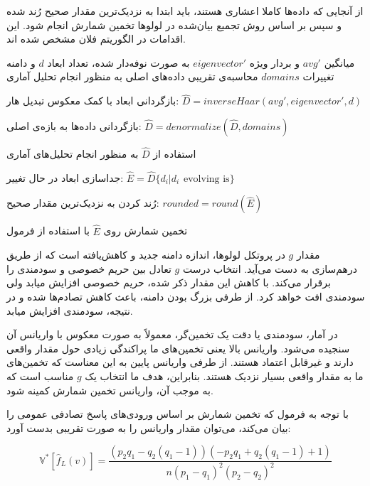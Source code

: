 از آنجایی که داده‌ها کاملا اعشاری هستند، باید ابتدا به نزدیک‌ترین مقدار صحیح رُند شده و سپس بر اساس روش تجمیع بیان‌شده در لولوها تخمین شمارش انجام شود. این اقدامات در الگوریتم فلان مشخص شده اند.


 میانگین $avg'$ و بردار ویژه $eigenvector'$ به صورت نوفه‌دار شده، تعداد ابعاد $d$ و دامنه تغییرات $domains$
 محاسبه‌ی تقریبی داده‌های اصلی به منظور انجام تحلیل آماری

 بازگردانی ابعاد با کمک معکوس تبدیل هار: $\hat{D} = inverseHaar(avg', eigenvector', d)$

 بازگردانی داده‌ها به بازه‌ی اصلی: $\hat{D} = denormalize(\hat{D}, domains)$

 استفاده از $\hat{D}$ به منظور انجام تحلیل‌های آماری

 جداسازی ابعاد در حال تغییر: $\hat{E} = \hat{D}\{d_i | d_i \hspace{5pt} \text{evolving is}\}$

 رُند کردن به نزدیک‌ترین مقدار صحیح: $rounded = round(\hat{E})$

 تخمین شمارش روی $\hat{E}$ با استفاده از فرمول 



مقدار $g$ در پروتکل لولوها، اندازه دامنه جدید و کاهش‌یافته است که از طریق درهم‌سازی به دست می‌آید. انتخاب درست $g$ تعادل بین حریم خصوصی و سودمندی را برقرار می‌کند. با کاهش این مقدار ذکر شده، حریم خصوصی افزایش میابد ولی سودمندی افت خواهد کرد. از طرفی بزرگ بودن دامنه، باعث کاهش تصادم‌ها شده و در نتیجه، سودمندی افزایش میابد.

در آمار، سودمندی یا دقت یک تخمین‌گر، معمولاً به صورت معکوس با واریانس آن سنجیده می‌شود. واریانس بالا یعنی تخمین‌های ما پراکندگی زیادی حول مقدار واقعی دارند و غیرقابل اعتماد هستند. از طرفی واریانس پایین به این معناست که تخمین‌های ما به مقدار واقعی بسیار نزدیک هستند. بنابراین، هدف ما انتخاب یک $g$ مناسب است که به موجب آن، واریانس تخمین شمارش کمینه شود.


با توجه به فرمول  که تخمین شمارش بر اساس ورودی‌های پاسخ تصادفی عمومی را بیان می‌کند، می‌توان مقدار واریانس را به صورت تقریبی بدست آورد:

\begin{equation}
\mathbb{V}^*[\hat{f}_L(v)] = \frac{(p_2q_1 - q_2(q_1-1))(-p_2q_1 + q_2(q_1-1)+1)}{n(p_1-q_1)^2(p_2-q_2)^2}
\end{equation}

